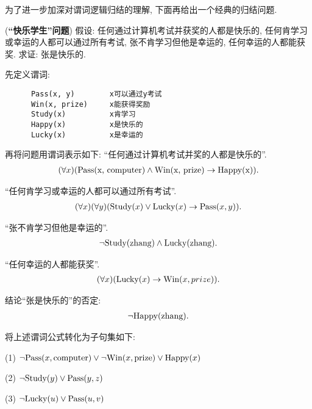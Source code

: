 为了进一步加深对谓词逻辑归结的理解, 下面再给出一个经典的归结问题.
\begin{example}
    (\textbf{“快乐学生”问题}) 假设: 任何通过计算机考试并获奖的人都是快乐的, 任何肯学习或幸运的人都可以通过所有考试, 张不肯学习但他是幸运的, 任何幸运的人都能获奖.
求证: 张是快乐的.
\end{example}
\begin{result}
先定义谓词:
\begin{Verbatim}
      Pass(x, y)        x可以通过y考试
      Win(x, prize)     x能获得奖励
      Study(x)          x肯学习
      Happy(x)          x是快乐的
      Lucky(x)          x是幸运的
\end{Verbatim}

再将问题用谓词表示如下: “任何通过计算机考试并奖的人都是快乐的”.
\begin{align}
    (\forall x)(\textup{Pass(x, computer)}\wedge \textup{Win(x, prize)}\rightarrow \textup{Happy(x)}).
\end{align}

“任何肯学习或幸运的人都可以通过所有考试”.
\begin{align}
    (\forall x) (\forall  y) (\textup{Study}(x)\vee \textup{Lucky}(x)\rightarrow \textup{Pass}(x, y)).
\end{align}

“张不肯学习但他是幸运的”.
\begin{align}
    \neg \textup{Study}(\textup{zhang})\wedge \textup{Lucky}(\textup{zhang}).
\end{align}

“任何幸运的人都能获奖”.
\begin{align}
    (\forall x) (\textup{Lucky}(x)\rightarrow \textup{Win}(x, prize)).
\end{align}

结论“张是快乐的”的否定:
\begin{align}
    \neg \textup{Happy}(\textup{zhang}).
\end{align}
\end{result}

将上述谓词公式转化为子句集如下:

    (1) $\neg \textup{Pass}(x, \textup{computer})\vee \neg \textup{Win}(x, \textup{prize})\vee \textup{Happy}(x)$

    (2) $\neg \textup{Study}(y)\vee \textup{Pass}(y, z)$

    (3) $\neg \textup{Lucky}(u)\vee \textup{Pass}(u, v)$

